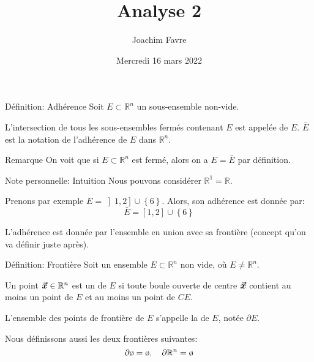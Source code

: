 \documentclass[a4paper]{article}
\title{Analyse 2}
\author{Joachim Favre}
\date{Mercredi 16 mars 2022}
\begin{document}
\maketitle


\begin{parag}{Définition: Adhérence}
    Soit $E \subset \mathbb{R}^n$ un sous-ensemble non-vide.

    L'intersection de tous les sous-ensembles fermés contenant $E$ est appelée  de $E$. $\bar{E}$ est la notation de l'adhérence de $E$ dans $\mathbb{R}^n$.

    \begin{subparag}{Remarque}
        On voit que si $E \subset \mathbb{R}^n$ est fermé, alors on a $E = \bar{E}$ par définition.
    \end{subparag}

    \begin{subparag}{Note personnelle: Intuition}
        Nous pouvons considérer $\mathbb{R}^1 = \mathbb{R}$.

        Prenons par exemple $E = \left]1, 2\right] \cup \left\{6\right\}$. Alors, son adhérence est donnée par: 
        \[\bar{E} = \left[1, 2\right] \cup \left\{6\right\}\]
        
        L'adhérence est donnée par l'ensemble en union avec sa frontière (concept qu'on va définir juste après).
    \end{subparag}
\end{parag}

\begin{parag}{Définition: Frontière}
    Soit un ensemble $E \subset \mathbb{R}^n$ non vide, où $E \neq \mathbb{R}^n$. 

    Un point $\bm{\protect\vec{x}} \in \mathbb{R}^n$ est un  de $E$ si toute boule ouverte de centre $\bm{\protect\vec{x}}$ contient au moins un point de $E$ et au moins un point de $CE$.

    L'ensemble des points de frontière de $E$ s'appelle la  de $E$, notée $\partial E$.

    Nous définissons aussi les deux frontières suivantes: 
    \[\partial \o = \o, \mathspace \partial \mathbb{R}^n = \o\]
    
\end{parag}
\end{document}
